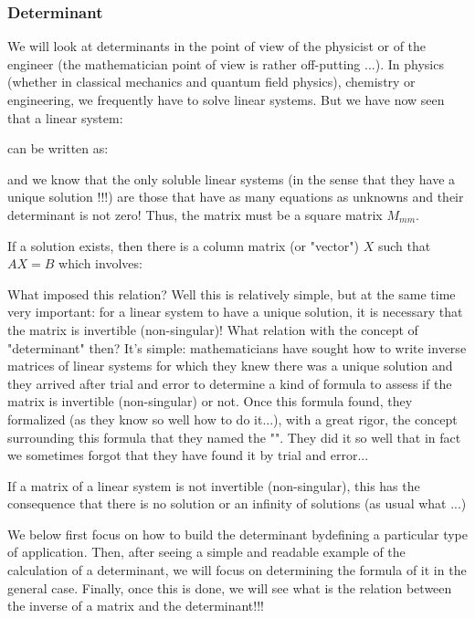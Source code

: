 	\subsubsection{Determinant}\label{determinant}
	We will look at determinants in the point of view of the physicist or of the engineer (the mathematician point of view is rather off-putting ...). In physics (whether in classical mechanics and quantum field physics), chemistry or engineering, we frequently have to solve linear systems. But we have now seen that a linear system:
	
	can be written as:
	
	and we know that the only soluble linear systems (in the sense that they have a unique solution !!!) are those that have as many equations as unknowns and their determinant is not zero! Thus, the matrix must be a square matrix $M_{mm}$.
	
	If a solution exists, then there is a column matrix (or "vector") $X$ such that $AX=B$ which involves:
	
	What imposed this relation? Well this is relatively simple, but at the same time very important: for a linear system to have a unique solution, it is necessary that the matrix is invertible (non-singular)! What relation with the  concept of "determinant" then? It's simple: mathematicians have sought how to write inverse matrices of linear systems for which they knew there was a unique solution and they arrived after trial and error to determine a kind of formula to assess if the matrix is invertible (non-singular) or not. Once this formula found, they formalized (as they know so well how to do it...), with a great rigor, the concept surrounding this formula that they named the "". They did it so well that in fact we sometimes forgot that they have found it by trial and error...
	\begin{tcolorbox}[title=Remark,colframe=black,arc=10pt]
	If a matrix of a linear system is not invertible (non-singular), this has the consequence that there is no solution or an infinity of solutions (as usual what ...)
	\end{tcolorbox}
	We below first focus on how to build the determinant bydefining a particular type of application. Then, after seeing a simple and readable example of the calculation of a determinant, we will focus on determining the formula of it in the general case. Finally, once this is done, we will see what is the relation between the inverse of a matrix and the determinant!!!
	
